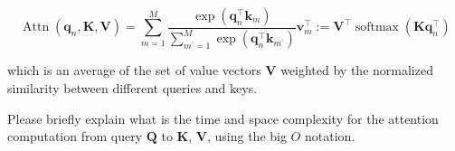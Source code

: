 \documentclass[10pt]{article}
\begin{document}
$$
  \operatorname{Attn}\left(\mathbf{q}_{n}, \mathbf{K}, \mathbf{V}\right)=\sum_{m=1}^{M} \frac{\exp \left(\mathbf{q}_{n}^{\top} \mathbf{k}_{m}\right)}{\sum_{m^{\prime}=1}^{M} \exp \left(\mathbf{q}_{n}^{\top} \mathbf{k}_{m^{\prime}}\right)} \mathbf{v}_{m}^{\top}:=\mathbf{V}^{\top} \operatorname{softmax}\left(\mathbf{K} \mathbf{q}_{n}^{\top}\right)
$$

which is an average of the set of value vectors $\mathbf{V}$ weighted by the normalized similarity between different queries and keys.

Please briefly explain what is the time and space complexity for the attention computation from query $\mathbf{Q}$ to $\mathbf{K}$, $\mathbf{V}$, using the big $O$ notation.
\end{document}
